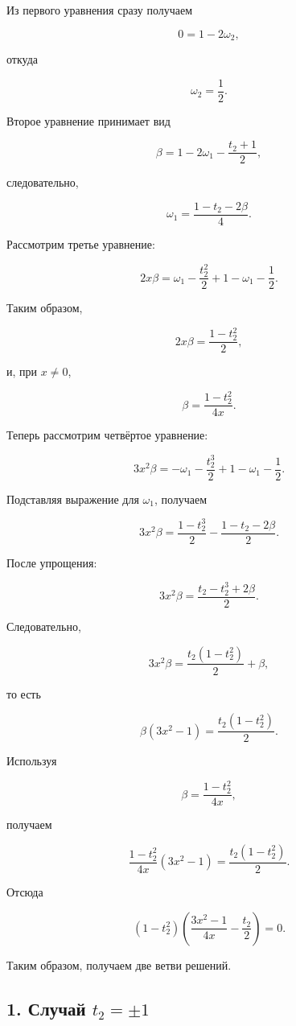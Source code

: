 \documentclass[12pt,a4paper]{article}
\begin{document}
	Из первого уравнения сразу получаем
	
	$$
	0=1-2\omega_2,
	$$
	
	откуда
	
	$$
	\boxed{\omega_2=\frac12}.
	$$
	
	Второе уравнение принимает вид
	
	$$
	\beta
	=
	1-2\omega_1-\frac{t_2+1}{2},
	$$
	
	следовательно,
	
	$$
	\boxed{
		\omega_1=\frac{1-t_2-2\beta}{4}
	}.
	$$
	
	Рассмотрим третье уравнение:
	
	$$
	2x\beta
	=
	\omega_1-\frac{t_2^2}{2}
	+1-\omega_1-\frac12.
	$$
	
	Таким образом,
	
	$$
	2x\beta=\frac{1-t_2^2}{2},
	$$
	
	и, при \(x\neq0\),
	
	$$
	\boxed{
		\beta=\frac{1-t_2^2}{4x}
	}.
	$$
	
	Теперь рассмотрим четвёртое уравнение:
	
	$$
	3x^2\beta
	=
	-\omega_1-\frac{t_2^3}{2}
	+1-\omega_1-\frac12.
	$$
	
	Подставляя выражение для \(\omega_1\), получаем
	
	$$
	3x^2\beta
	=
	\frac{1-t_2^3}{2}
	-\frac{1-t_2-2\beta}{2}.
	$$
	
	После упрощения:
	
	$$
	3x^2\beta
	=
	\frac{t_2-t_2^3+2\beta}{2}.
	$$
	
	Следовательно,
	
	$$
	3x^2\beta
	=
	\frac{t_2(1-t_2^2)}{2}+\beta,
	$$
	
	то есть
	
	$$
	\beta(3x^2-1)
	=
	\frac{t_2(1-t_2^2)}{2}.
	$$
	
	Используя
	
	$$
	\beta=\frac{1-t_2^2}{4x},
	$$
	
	получаем
	
	$$
	\frac{1-t_2^2}{4x}(3x^2-1)
	=
	\frac{t_2(1-t_2^2)}{2}.
	$$
	
	Отсюда
	
	$$
	(1-t_2^2)
	\left(
	\frac{3x^2-1}{4x}
	-\frac{t_2}{2}
	\right)=0.
	$$
	
	Таким образом, получаем две ветви решений.
	
	\subsection*{1. Случай \(t_2=\pm1\)}
	
\end{document}

